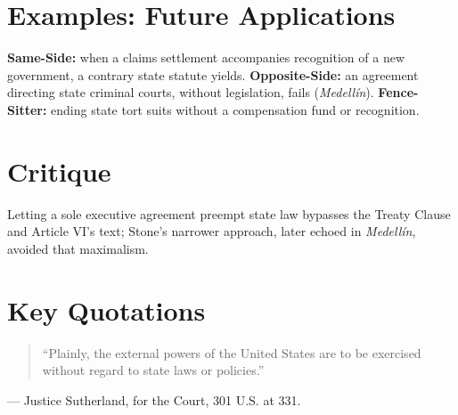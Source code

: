 \documentclass[12pt]{article}
\begin{document}
\section{Examples: Future Applications}
\textbf{Same-Side:} when a claims settlement accompanies recognition of a new government, a contrary state statute yields. \textbf{Opposite-Side:} an agreement directing state criminal courts, without legislation, fails (\textit{Medell\'in}). \textbf{Fence-Sitter:} ending state tort suits without a compensation fund or recognition.

\section{Critique}
Letting a sole executive agreement preempt state law bypasses the Treaty Clause and Article VI's text; Stone's narrower approach, later echoed in \textit{Medell\'in}, avoided that maximalism.

\section{Key Quotations}
\begin{quote}
``Plainly, the external powers of the United States are to be exercised without regard to state laws or policies.''
\end{quote}
\noindent --- Justice Sutherland, for the Court, 301 U.S. at 331.
\end{document}
